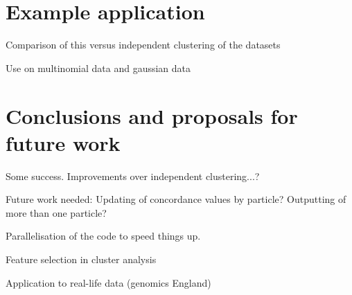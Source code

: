 \documentclass[10pt,a4paper]{report}
\begin{document}
\section{Example application}
Comparison of this versus independent clustering of the datasets

Use on multinomial data and gaussian data


\section{Conclusions and proposals for future work}
Some success. Improvements over independent clustering...?

Future work needed: Updating of concordance values by particle? Outputting of more than one particle?

Parallelisation of the code to speed things up.

Feature selection in cluster analysis

Application to real-life data (genomics England)







\end{document}
